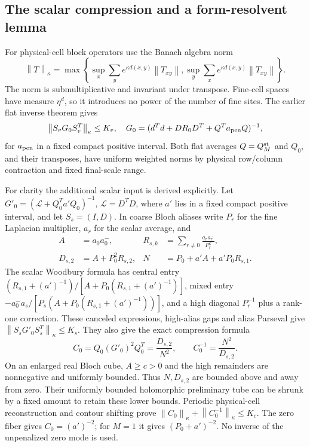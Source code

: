 \documentclass[11pt]{article}
\theoremstyle{remark}
\newcommand{\norm}[1]{\left\|#1\right\|}
\begin{document}
\subsection{The scalar compression and a form-resolvent lemma}
\label{nw-scalar}

For physical-cell block operators use the Banach algebra norm
\begin{equation}\label{nw-schur}
 \norm{T}_\kappa=\max\left\{
 \sup_x\sum_y e^{\kappa d(x,y)}\norm{T_{xy}},
 \sup_y\sum_x e^{\kappa d(x,y)}\norm{T_{xy}}\right\}.
\end{equation}
The norm is submultiplicative and invariant under transpose.
Fine-cell spaces have measure $\eta^d$, so it introduces no power
of the number of fine sites. The earlier flat inverse theorem gives
\begin{equation}\label{nw-flat-blocks}
 \norm{S_vG_0S_v^T}_\kappa\le K_v,
 \quad G_0=(d^Td+DR_0D^T+Q^Ta_{\rm pen}Q)^{-1},
\end{equation}
for $a_{\rm pen}$ in a fixed compact positive interval.
Both flat averages $Q=Q_M^{\rm st}$ and $Q_0$, and their transposes,
have uniform weighted norms by physical row/column contraction and
fixed final-scale range.

For clarity the additional scalar input is derived explicitly.
Let $G'_0=(\mathcal L+Q_0^Ta'Q_0)^{-1}$, $\mathcal L=D^TD$,
where $a'$ lies in a fixed compact positive interval, and let
$S_s=(I,D)$. In coarse Bloch aliases write $P_r$ for the fine
Laplacian multiplier, $a_r$ for the scalar average, and
\begin{align}
 A&=a_0a_0^-,&
 R_{s,k}&=\sum_{r\ne0}\frac{a_ra_r^-}{P_r^k},\nonumber\\
 D_{s,2}&=A+P_0^2R_{s,2},&
 N&=P_0+a'A+a'P_0R_{s,1}.                   \label{nw-scalar-denoms}
\end{align}
The scalar Woodbury formula has central entry
$(R_{s,1}+(a')^{-1})/[A+P_0(R_{s,1}+(a')^{-1})]$,
mixed entry $-a_0^-a_s/[P_s(A+P_0(R_{s,1}+(a')^{-1}))]$,
and a high diagonal $P_r^{-1}$ plus a rank-one correction.
These canceled expressions, high-alias gaps and alias Parseval
give $\norm{S_sG'_0S_s^T}_\kappa\le K_s$.
They also give the exact compression formula
\begin{equation}\label{nw-compression}
 C_0=Q_0(G'_0)^2Q_0^T=\frac{D_{s,2}}{N^2},
 \qquad C_0^{-1}=\frac{N^2}{D_{s,2}}.
\end{equation}
On an enlarged real Bloch cube, $A\ge c>0$ and the high remainders
are nonnegative and uniformly bounded. Thus $N,D_{s,2}$ are
bounded above and away from zero. Their uniformly bounded
holomorphic preliminary tube can be shrunk by a fixed amount to
retain these lower bounds. Periodic physical-cell reconstruction
and contour shifting prove
$\norm{C_0}_\kappa+\norm{C_0^{-1}}_\kappa\le K_c$.
The zero fiber gives $C_0=(a')^{-2}$; for $M=1$ it gives
$(P_0+a')^{-2}$. No inverse of the unpenalized zero mode is used.
\end{document}
